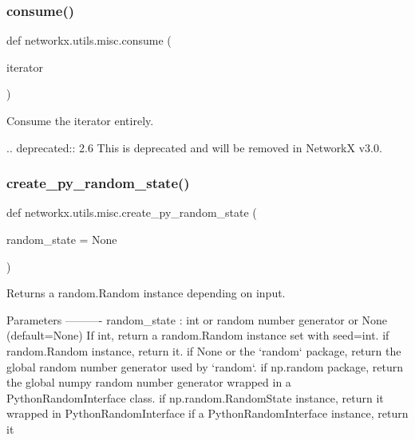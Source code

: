 \subsubsection{\texorpdfstring{consume()}{consume()}}
{\footnotesize\ttfamily def networkx.\+utils.\+misc.\+consume (\begin{DoxyParamCaption}\item[{}]{iterator }\end{DoxyParamCaption})}

\begin{DoxyVerb}Consume the iterator entirely.

.. deprecated:: 2.6
    This is deprecated and will be removed in NetworkX v3.0.
\end{DoxyVerb}
 \mbox{\label{namespacenetworkx_1_1utils_1_1misc_ad8c08698fd77aa410765b5aea62f9b10}} 
\subsubsection{\texorpdfstring{create\+\_\+py\+\_\+random\+\_\+state()}{create\_py\_random\_state()}}
{\footnotesize\ttfamily def networkx.\+utils.\+misc.\+create\+\_\+py\+\_\+random\+\_\+state (\begin{DoxyParamCaption}\item[{}]{random\+\_\+state = {\ttfamily None} }\end{DoxyParamCaption})}

\begin{DoxyVerb}Returns a random.Random instance depending on input.

Parameters
----------
random_state : int or random number generator or None (default=None)
    If int, return a random.Random instance set with seed=int.
    if random.Random instance, return it.
    if None or the `random` package, return the global random number
    generator used by `random`.
    if np.random package, return the global numpy random number
    generator wrapped in a PythonRandomInterface class.
    if np.random.RandomState instance, return it wrapped in
    PythonRandomInterface
    if a PythonRandomInterface instance, return it
\end{DoxyVerb}
 \mbox{\label{namespacenetworkx_1_1utils_1_1misc_a8eddf1b3913ba2b4d6e1e8f1eab984f1}} 
